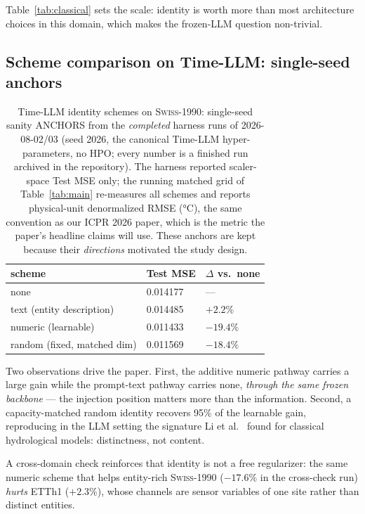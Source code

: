 \documentclass[sigconf,review]{acmart}
\newcommand{\swiss}{\textsc{Swiss-1990}}
\begin{document}
Table~\ref{tab:classical} sets the scale: identity is worth more than most
architecture choices in this domain, which makes the frozen-LLM question
non-trivial.

\subsection{Scheme comparison on Time-LLM: single-seed anchors}

\begin{table}[t]
\caption{Time-LLM identity schemes on \swiss{}: single-seed sanity ANCHORS from
the \emph{completed} harness runs of 2026-08-02/03 (seed 2026, the canonical
Time-LLM hyper-parameters, no HPO; every number is a finished run archived in the
repository). The harness reported scaler-space Test MSE only; the running matched
grid of Table~\ref{tab:main} re-measures all schemes and reports physical-unit
denormalized RMSE (°C), the same convention as our ICPR 2026 paper, which is the
metric the paper's headline claims will use. These anchors are kept because their
\emph{directions} motivated the study design.}
\label{tab:anchors}
\begin{tabular}{@{}lll@{}}
\toprule
scheme & Test MSE & $\Delta$ vs.\ \textsf{none} \\
\midrule
\textsf{none} & 0.014177 & --- \\
\textsf{text} (entity description) & 0.014485 & $+2.2\%$ \\
\textsf{numeric} (learnable) & 0.011433 & $\mathbf{-19.4\%}$ \\
\textsf{random} (fixed, matched dim) & 0.011569 & $-18.4\%$ \\
\bottomrule
\end{tabular}
\end{table}

Two observations drive the paper. First, the additive numeric pathway carries a
large gain while the prompt-text pathway carries none, \emph{through the same
frozen backbone} --- the injection position matters more than the information.
Second, a capacity-matched random identity recovers 95\% of the learnable gain,
reproducing in the LLM setting the signature Li et al.~\cite{li2022random} found
for classical hydrological models: distinctness, not content.

A cross-domain check reinforces that identity is not a free regularizer: the same
numeric scheme that helps entity-rich \swiss{} ($-17.6\%$ in the cross-check run)
\emph{hurts} ETTh1 ($+2.3\%$), whose channels are sensor variables of one site
rather than distinct entities.
\end{document}
